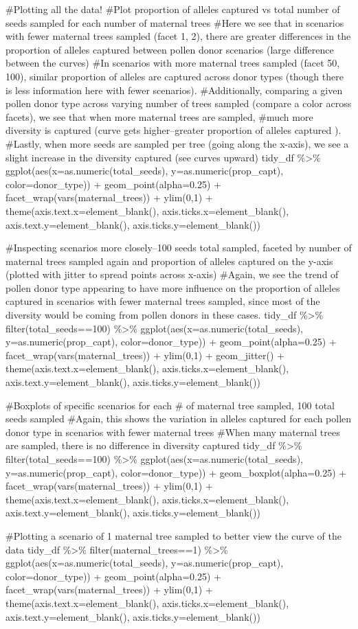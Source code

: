\documentclass[
]{article}
\begin{document}
\#Plotting all the data! \#Plot proportion of alleles captured vs total
number of seeds sampled for each number of maternal trees \#Here we see
that in scenarios with fewer maternal trees sampled (facet 1, 2), there
are greater differences in the proportion of alleles captured between
pollen donor scenarios (large difference between the curves) \#In
scenarios with more maternal trees sampled (facet 50, 100), similar
proportion of alleles are captured across donor types (though there is
less information here with fewer scenarios). \#Additionally, comparing a
given pollen donor type across varying number of trees sampled (compare
a color across facets), we see that when more maternal trees are
sampled, \#much more diversity is captured (curve gets higher--greater
proportion of alleles captured ). \#Lastly, when more seeds are sampled
per tree (going along the x-axis), we see a slight increase in the
diversity captured (see curves upward) tidy\_df \%\textgreater\%
ggplot(aes(x=as.numeric(total\_seeds), y=as.numeric(prop\_capt),
color=donor\_type)) + geom\_point(alpha=0.25) +
facet\_wrap(vars(maternal\_trees)) + ylim(0,1) +
theme(axis.text.x=element\_blank(), axis.ticks.x=element\_blank(),
axis.text.y=element\_blank(), axis.ticks.y=element\_blank())

\#Inspecting scenarios more closely--100 seeds total sampled, faceted by
number of maternal trees sampled again and proportion of alleles
captured on the y-axis (plotted with jitter to spread points across
x-axis) \#Again, we see the trend of pollen donor type appearing to have
more influence on the proportion of alleles captured in scenarios with
fewer maternal trees sampled, since most of the diversity would be
coming from pollen donors in these cases. tidy\_df \%\textgreater\%
filter(total\_seeds==100) \%\textgreater\%
ggplot(aes(x=as.numeric(total\_seeds), y=as.numeric(prop\_capt),
color=donor\_type)) + geom\_point(alpha=0.25) +
facet\_wrap(vars(maternal\_trees)) + ylim(0,1) + geom\_jitter() +
theme(axis.text.x=element\_blank(), axis.ticks.x=element\_blank(),
axis.text.y=element\_blank(), axis.ticks.y=element\_blank())

\#Boxplots of specific scenarios for each \# of maternal tree sampled,
100 total seeds sampled \#Again, this shows the variation in alleles
captured for each pollen donor type in scenarios with fewer maternal
trees \#When many maternal trees are sampled, there is no difference in
diversity captured tidy\_df \%\textgreater\% filter(total\_seeds==100)
\%\textgreater\% ggplot(aes(x=as.numeric(total\_seeds),
y=as.numeric(prop\_capt), color=donor\_type)) +
geom\_boxplot(alpha=0.25) + facet\_wrap(vars(maternal\_trees)) +
ylim(0,1) + theme(axis.text.x=element\_blank(),
axis.ticks.x=element\_blank(), axis.text.y=element\_blank(),
axis.ticks.y=element\_blank())

\#Plotting a scenario of 1 maternal tree sampled to better view the
curve of the data tidy\_df \%\textgreater\% filter(maternal\_trees==1)
\%\textgreater\% ggplot(aes(x=as.numeric(total\_seeds),
y=as.numeric(prop\_capt), color=donor\_type)) + geom\_point(alpha=0.25)
+ facet\_wrap(vars(maternal\_trees)) + ylim(0,1) +
theme(axis.text.x=element\_blank(), axis.ticks.x=element\_blank(),
axis.text.y=element\_blank(), axis.ticks.y=element\_blank())
\end{document}
